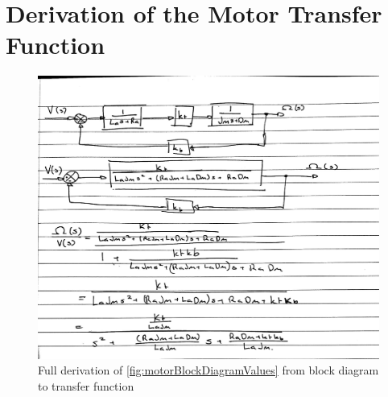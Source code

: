 \documentclass[a4paper, 11pt, compsoc]{IEEEtran}
\begin{document}
        \section{Derivation of the Motor Transfer Function}\label{app:motorDerivation}
            \begin{figure}[!h]
                \centering
                \includegraphics[width=\columnwidth]{lab2Derivation.jpg}
                \caption{Full derivation of \cref{fig:motorBlockDiagramValues} from block diagram to transfer function}
                \label{fig:motorDerivation}
            \end{figure}
\end{document}
